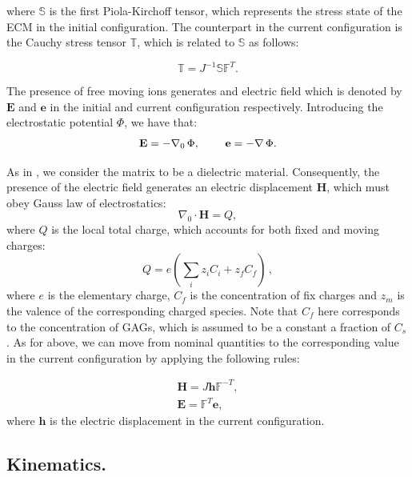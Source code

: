 \documentclass[runningheads]{llncs}
\newcommand{\F}{\ensuremath{\mathbb{F}}}
\begin{document}
where $\mathbb{S}$ is the first Piola-Kirchoff tensor, which represents the stress state of the ECM in the initial configuration. The counterpart in the current configuration is the Cauchy stress tensor $\mathbb{T}$, which is related to $\mathbb{S}$ as follows:

\begin{equation}
\mathbb{T} = J^{-1}\mathbb{S}\F^T.
\end{equation}

The presence of free moving ions generates and electric field which is denoted by $\mathbf{E}$ and $\mathbf{e}$ in the initial and current configuration respectively. Introducing the electrostatic potential $\Phi$, we have that:
\begin{equation}
\mathbf{E}= -\nabla_0 \, \Phi, \hspace{8mm} \mathbf{e}= - \nabla \, \Phi.
\end{equation}

As in \cite{Reviewpolyel}, we consider the matrix to be a dielectric material. Consequently, the presence of the electric field generates an electric displacement $\mathbf{H}$, which must obey Gauss law of electrostatics:
\begin{equation}
\nabla_0 \cdot \mathbf{H}= Q,
\label{gauss}
\end{equation}
where $Q$ is the local total charge, which accounts for both fixed and moving charges:
\begin{equation}
Q = e\left(\sum\limits_{i} z_i C_i+z_f C_{f}\right)\, , 
\end{equation}
where $e$ is the elementary charge, $C_f$ is the concentration of fix charges and $z_m$ is the valence of the corresponding charged species. Note that $C_f$ here corresponds to the concentration of GAGs, which is assumed to be a constant a fraction of $C_s$. As for above, we can move from nominal quantities to the corresponding value in the current configuration by applying the following rules:

\begin{eqnarray}
\mathbf{H} = J \mathbf{h}\F^{-T},\\
\mathbf{E} = \F^T \mathbf{e},
\end{eqnarray}
where $\mathbf{h}$ is the electric displacement in the current configuration.

\subsection{Kinematics.}
\label{kin}
\end{document}
